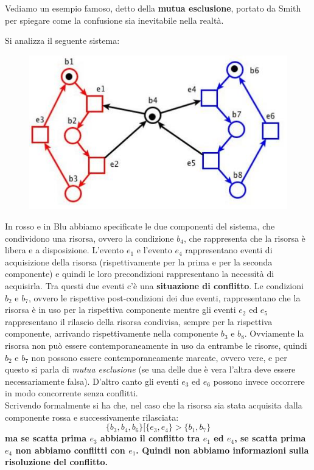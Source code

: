 Vediamo un esempio famoso, detto della \textbf{mutua esclusione}, portato da
Smith per spiegare come la confusione sia inevitabile nella realtà.
\newpage
\begin{esempio}
  Si analizza il seguente sistema:
  \begin{figure}[H]
    \centering
    \includegraphics[scale = 0.4]{img/mes.jpg} 
  \end{figure}
  In rosso e in Blu abbiamo specificate le due componenti del sistema, che
  condividono una risorsa, ovvero la condizione $b_4$, che rappresenta che la
  risorsa è libera e a disposizione. L'evento $e_1$ e l'evento $e_4$ rappresentano
  eventi di acquisizione della risorsa (rispettivamente per la prima e per la
  seconda componente) e quindi le loro precondizioni rappresentano la necessità
  di acquisirla. Tra questi due eventi c'è una \textbf{situazione di
    conflitto}. Le condizioni $b_2$ e $b_7$, ovvero le rispettive post-condizioni
  dei due eventi, rappresentano che la risorsa è in uso per la rispettiva
  componente mentre gli eventi $e_2$ ed $e_5$ rappresentano il rilascio della
  risorsa condivisa, sempre per la rispettiva componente, arrivando
  rispettivamente nella componente $b_3$ e $b_8$. Ovviamente la risorsa
  non può essere contemporaneamente in uso da entrambe le risorse, quindi $b_2$
  e $b_7$ non possono essere contemporaneamente marcate, ovvero vere, e per
  questo si parla di \textit{mutua esclusione} (se una delle due è vera l'altra
  deve essere necessariamente falsa). D'altro canto gli
  eventi $e_3$ ed $e_6$ possono invece occorrere in modo concorrente senza
  conflitti.\\
  Scrivendo formalmente si ha che, nel caso che la risorsa sia stata acquisita
  dalla componente rossa e successivamente rilasciata:
  \[\{b_3, b_4, b_6\}[\{e_3, e_4\}>\{b_1, b_7\}\]
  \textbf{ma se scatta prima $e_3$ abbiamo il conflitto tra $e_1$ ed $e_4$, se scatta prima
  $e_4$ non abbiamo conflitti con $e_1$. Quindi non abbiamo informazioni sulla risoluzione
  del conflitto.}\\
\end{esempio}
